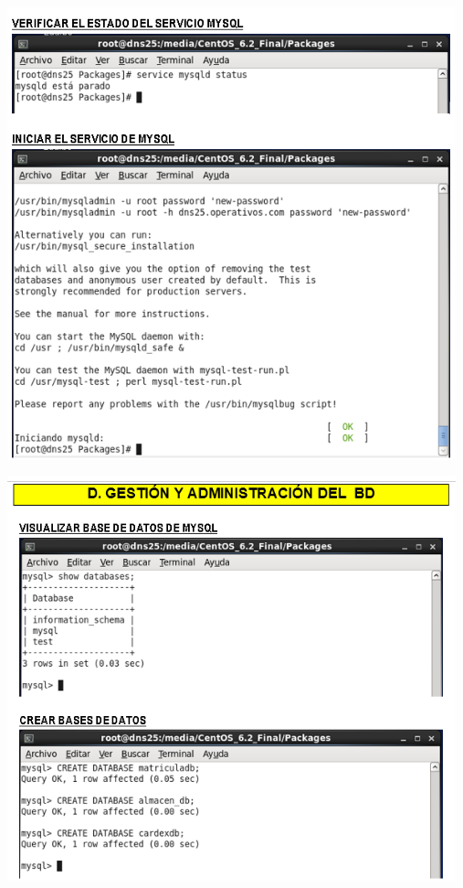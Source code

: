 \begin{itemize}
	\begin{center}
		\includegraphics[width=13cm]{./Imagenes/11a}
		\end{center}
\end{itemize} 

\begin{itemize}
	\begin{center}
		\includegraphics[width=13cm]{./Imagenes/12a}
		\end{center}
\end{itemize} 

